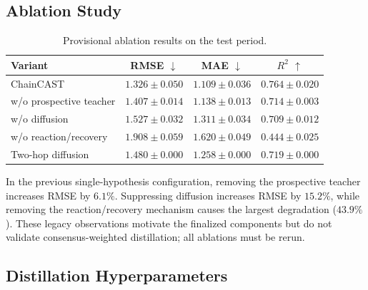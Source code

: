 \documentclass[letterpaper]{article} %
\begin{document}
\subsection{Ablation Study}

\begin{table}[t]
\centering
\footnotesize
\setlength{\tabcolsep}{2.5pt}
\begin{tabular}{lccc}
\toprule
Variant & RMSE \(\downarrow\) & MAE \(\downarrow\) & \(R^2\) \(\uparrow\) \\
\midrule
ChainCAST & \(\mathbf{1.326}{\pm}0.050\) & \(\mathbf{1.109}{\pm}0.036\) & \(\mathbf{0.764}{\pm}0.020\) \\
w/o prospective teacher & \(1.407{\pm}0.014\) & \(1.138{\pm}0.013\) & \(0.714{\pm}0.003\) \\
w/o diffusion & \(1.527{\pm}0.032\) & \(1.311{\pm}0.034\) & \(0.709{\pm}0.012\) \\
w/o reaction/recovery & \(1.908{\pm}0.059\) & \(1.620{\pm}0.049\) & \(0.444{\pm}0.025\) \\
Two-hop diffusion & \(1.480{\pm}0.000\) & \(1.258{\pm}0.000\) & \(0.719{\pm}0.000\) \\
\bottomrule
\end{tabular}
\caption{Provisional ablation results on the test period.}
\label{tab:ablation}
\end{table}

In the previous single-hypothesis configuration, removing the prospective teacher increases RMSE by \(6.1\%\). Suppressing diffusion increases RMSE by \(15.2\%\), while removing the reaction/recovery mechanism causes the largest degradation (\(43.9\%\)). These legacy observations motivate the finalized components but do not validate consensus-weighted distillation; all ablations must be rerun.

\subsection{Distillation Hyperparameters}
\end{document}
